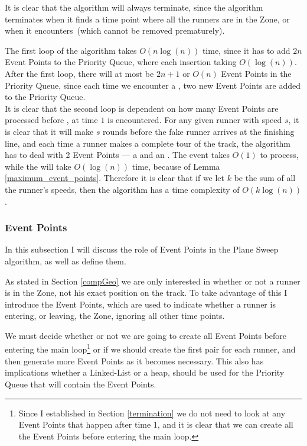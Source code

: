 \begin{theo}[Termination:]
It is clear that the algorithm will always terminate, since the algorithm terminates when it finds a time point where all the runners are in the Zone, or when it encounters \comFin\,(which cannot be removed prematurely).
\end{theo}

\begin{theo}
The first loop of the algorithm takes $O(n\log(n))$ time, since it has to add $2n$ Event Points to the Priority Queue, where each insertion taking $O(\log(n))$.\\

After the first loop, there will at most be $2n + 1$ or $O(n)$ Event Points in the Priority Queue, since each time we encounter a \comEnd, two new Event Points are added to the Priority Queue.\\ 

It is clear that the second loop is dependent on how many Event Points are processed before \comFin, at time $1$ is encountered. For any given runner with speed $s$, it is clear that it will make $s$ rounds before the fake runner arrives at the finishing line, and each time  a runner makes a complete tour of the track, the algorithm has to deal with 2 Event Points --- a \comStart\; and an \comEnd. The \comStart\; event takes $O(1)$ to process, while the \comEnd\; will take $O(\log(n))$ time, because of Lemma \ref{maximum_event_points}. Therefore it is clear that if we let  $k$ be the sum of all the runner's speeds, then the algorithm has a time complexity of $O(k\log(n))$.
\end{theo}

\subsubsection{Event Points}
\label{eventPoints}
In this subsection I will discuss the role of Event Points in the Plane Sweep algorithm, as well as define them. 

As stated in Section \ref{compGeo} we are only interested in whether or not a runner is in the Zone, not his exact position on the track. To take advantage of this I introduce the Event Points, which are used to indicate whether a runner is entering, or leaving, the Zone, ignoring all other time points. 

We must decide whether or not we are going to create all Event Points before entering the main loop\footnote{Since I established in Section \ref{termination} we do not need to look at any Event Points that happen after time 1, and it is clear that we can create all the Event Points before entering the main loop.} or if we should create the first pair for each runner, and then generate more Event Points as it becomes necessary. This also has implications whether a Linked-List or a heap, should be used for the Priority Queue that will contain the Event Points. 

